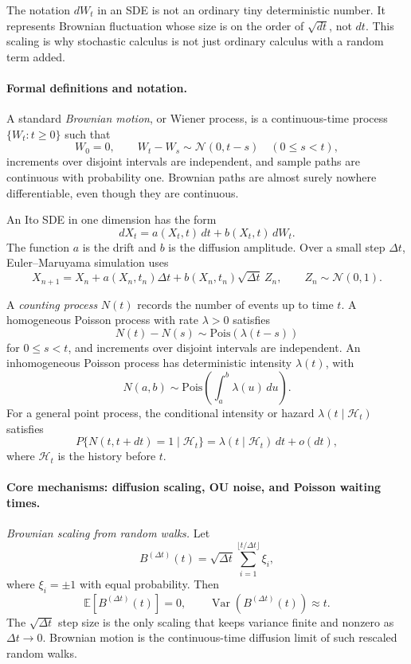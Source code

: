 The notation \(dW_t\) in an SDE is not an ordinary tiny deterministic number. It represents Brownian fluctuation whose size is on the order of \(\sqrt{dt}\), not \(dt\). This scaling is why stochastic calculus is not just ordinary calculus with a random term added.

\paragraph{Formal definitions and notation.}
A standard \emph{Brownian motion}, or Wiener process, is a continuous-time process \(\{W_t:t\geq0\}\) such that
\[
W_0=0,\qquad W_t-W_s\sim\mathcal N(0,t-s)\quad(0\leq s<t),
\]
increments over disjoint intervals are independent, and sample paths are continuous with probability one. Brownian paths are almost surely nowhere differentiable, even though they are continuous.

An Ito SDE in one dimension has the form
\[
\boxed{dX_t=a(X_t,t)\,dt+b(X_t,t)\,dW_t.}
\]
The function \(a\) is the drift and \(b\) is the diffusion amplitude. Over a small step \(\Delta t\), Euler--Maruyama simulation uses
\[
X_{n+1}=X_n+a(X_n,t_n)\Delta t+b(X_n,t_n)\sqrt{\Delta t}\,Z_n,
\qquad Z_n\sim\mathcal N(0,1).
\]

A \emph{counting process} \(N(t)\) records the number of events up to time \(t\). A homogeneous Poisson process with rate \(\lambda>0\) satisfies
\[
N(t)-N(s)\sim\mathrm{Pois}(\lambda(t-s))
\]
for \(0\leq s<t\), and increments over disjoint intervals are independent. An inhomogeneous Poisson process has deterministic intensity \(\lambda(t)\), with
\[
N(a,b)\sim \mathrm{Pois}\!\left(\int_a^b \lambda(u)\,du\right).
\]
For a general point process, the conditional intensity or hazard \(\lambda(t\mid\mathcal H_t)\) satisfies
\[
P\{N(t,t+dt)=1\mid\mathcal H_t\}
=\lambda(t\mid\mathcal H_t)\,dt+o(dt),
\]
where \(\mathcal H_t\) is the history before \(t\).

\paragraph{Core mechanisms: diffusion scaling, OU noise, and Poisson waiting times.}
\emph{Brownian scaling from random walks.} Let
\[
B^{(\Delta t)}(t)=\sqrt{\Delta t}\sum_{i=1}^{\lfloor t/\Delta t\rfloor}\xi_i,
\]
where \(\xi_i=\pm1\) with equal probability. Then
\[
\mathbb E[B^{(\Delta t)}(t)]=0,\qquad
\operatorname{Var}(B^{(\Delta t)}(t))\approx t.
\]
The \(\sqrt{\Delta t}\) step size is the only scaling that keeps variance finite and nonzero as \(\Delta t\to0\). Brownian motion is the continuous-time diffusion limit of such rescaled random walks.

